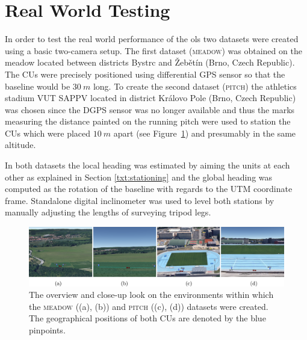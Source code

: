 \section{Real World Testing} \label{txt:real_world_testing}

In order to test the real world performance of the \gls{ols} two datasets were created using a basic two-camera setup. The first dataset (\textsc{meadow}) was obtained on the meadow located between districts Bystrc and Žebětín (Brno, Czech Republic). The CUs were precisely positioned using differential GPS sensor so that the baseline would be $30~m$ long. To create the second dataset (\textsc{pitch}) the athletics stadium VUT SAPPV located in district Královo Pole (Brno, Czech Republic) was chosen since the DGPS sensor was no longer available and thus the marks measuring the distance painted on the running pitch were used to station the CUs which were placed $10~m$ apart (see Figure~\ref{fig:dataset_zebetin_vut}) and presumably in the same altitude.

In both datasets the local heading was estimated by aiming the units at each other as explained in Section \ref{txt:stationing} and the global heading was computed as the rotation of the baseline with regards to the UTM coordinate frame. Standalone digital inclinometer was used to level both stations by manually adjusting the lengths of surveying tripod legs.

\begin{figure}[htb]\centering
	\centering
	\includegraphics[width=0.98\linewidth]{fig/dataset_zebetin_vut.png}
	\caption{The overview and close-up look on the environments within which the \textsc{meadow} ((a), (b)) and \textsc{pitch} ((c), (d)) datasets were created. The geographical positions of both CUs are denoted by the blue pinpoints.}
	\label{fig:dataset_zebetin_vut}
\end{figure}

